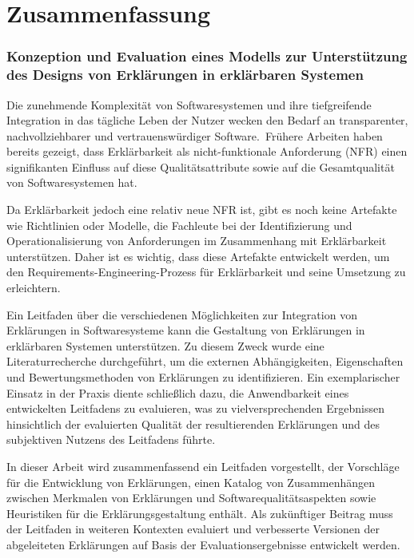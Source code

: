 \chapter*{Zusammenfassung}

\subsection*{Konzeption und Evaluation eines Modells zur Unterstützung des Designs von Erklärungen in erklärbaren Systemen}

Die zunehmende Komplexität von Softwaresystemen und ihre tiefgreifende Integration in das tägliche Leben der Nutzer wecken den Bedarf an transparenter, nachvollziehbarer und vertrauenswürdiger Software. Frühere Arbeiten haben bereits gezeigt, dass Erklärbarkeit als nicht-funktionale Anforderung (NFR) einen signifikanten Einfluss auf diese Qualitätsattribute sowie auf die Gesamtqualität von Softwaresystemen hat.

Da Erklärbarkeit jedoch eine relativ neue NFR ist, gibt es noch keine Artefakte wie Richtlinien oder Modelle, die Fachleute bei der Identifizierung und Operationalisierung von Anforderungen im Zusammenhang mit Erklärbarkeit unterstützen. Daher ist es wichtig, dass diese Artefakte entwickelt werden, um den Requirements-Engineering-Prozess für Erklärbarkeit und seine Umsetzung zu erleichtern.

Ein Leitfaden über die verschiedenen Möglichkeiten zur Integration von Erklärungen in Softwaresysteme kann die Gestaltung von Erklärungen in erklärbaren Systemen unterstützen. Zu diesem Zweck wurde eine Literaturrecherche durchgeführt, um die externen Abhängigkeiten, Eigenschaften und Bewertungsmethoden von Erklärungen zu identifizieren. Ein exemplarischer Einsatz in der Praxis diente schließlich dazu, die Anwendbarkeit eines entwickelten Leitfadens zu evaluieren, was zu vielversprechenden Ergebnissen hinsichtlich der evaluierten Qualität der resultierenden Erklärungen und des subjektiven Nutzens des Leitfadens führte. 

In dieser Arbeit wird zusammenfassend ein Leitfaden vorgestellt, der Vorschläge für die Entwicklung von Erklärungen, einen Katalog von Zusammenhängen zwischen Merkmalen von Erklärungen und Softwarequalitätsaspekten sowie Heuristiken für die Erklärungsgestaltung enthält. Als zukünftiger Beitrag muss der Leitfaden in weiteren Kontexten evaluiert und verbesserte Versionen der abgeleiteten Erklärungen auf Basis der Evaluationsergebnisse entwickelt werden.

